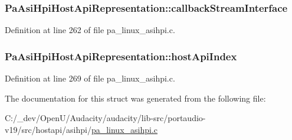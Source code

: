 \subsubsection[{\texorpdfstring{callback\+Stream\+Interface}{callbackStreamInterface}}]{ Pa\+Asi\+Hpi\+Host\+Api\+Representation\+::callback\+Stream\+Interface}\hypertarget{struct_pa_asi_hpi_host_api_representation_ad1d68d17d9ab37be6a3ec0c48749f0f4}{}\label{struct_pa_asi_hpi_host_api_representation_ad1d68d17d9ab37be6a3ec0c48749f0f4}


Definition at line 262 of file pa\+\_\+linux\+\_\+asihpi.\+c.

\subsubsection[{\texorpdfstring{host\+Api\+Index}{hostApiIndex}}]{ Pa\+Asi\+Hpi\+Host\+Api\+Representation\+::host\+Api\+Index}\hypertarget{struct_pa_asi_hpi_host_api_representation_abad64b525a3e7fb58f73414dba93340a}{}\label{struct_pa_asi_hpi_host_api_representation_abad64b525a3e7fb58f73414dba93340a}


Definition at line 269 of file pa\+\_\+linux\+\_\+asihpi.\+c.



The documentation for this struct was generated from the following file\+:\begin{DoxyCompactItemize}
\item 
C\+:/\+\_\+dev/\+Open\+U/\+Audacity/audacity/lib-\/src/portaudio-\/v19/src/hostapi/asihpi/\hyperlink{pa__linux__asihpi_8c}{pa\+\_\+linux\+\_\+asihpi.\+c}\end{DoxyCompactItemize}
